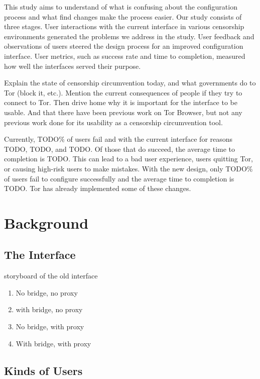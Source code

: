 \documentclass{template}
\begin{document}
This study aims to understand of what is confusing about the configuration process and what find changes make the process easier. Our study consists of three stages. User interactions with the current interface in various censorship environments generated the problems we address in the study. User feedback and observations of users steered the design process for an improved configuration interface. User metrics, such as success rate and time to completion, measured how well the interfaces served their purpose. 

{\color {red}
Explain the state of censorship circumvention today, and what governments do to Tor (block it, etc.). Mention the current consequences of people if they try to connect to Tor. Then drive home why it is important for the interface to be usable. And that there have been previous work on Tor Browser, but not any previous work done for its usability as a censorship circumvention tool.
}

Currently, {\color {red} TODO}\% of users fail and with the current interface for reasons {\color {red} TODO}, {\color {red} TODO}, and {\color {red} TODO}. Of those that do succeed, the average time to completion is {\color {red} TODO}. This can lead to a bad user experience, users quitting Tor, or causing high-risk users to make mistakes. With the new design, only {\color {red} TODO}\% of users fail to configure successfully and the average time to completion is {\color {red} TODO}. Tor has already implemented some of these changes. 

\section{Background} 
\subsection{The Interface} 
{\color {red} storyboard of the old interface 

\begin{enumerate} \itemsep1pt \parskip0pt 
    \item No bridge, no proxy
    \item with bridge, no proxy
    \item No bridge, with proxy
    \item With bridge, with proxy
\end{enumerate}
}
\subsection{Kinds of Users} 
\end{document}
